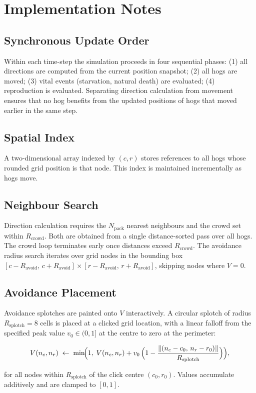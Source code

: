 \documentclass[11pt]{article}
\begin{document}
\section{Implementation Notes}

\subsection{Synchronous Update Order}

Within each time-step the simulation proceeds in four sequential phases:
(1) all directions are computed from the current position snapshot;
(2) all hogs are moved;
(3) vital events (starvation, natural death) are evaluated;
(4) reproduction is evaluated.
Separating direction calculation from movement ensures that no hog benefits
from the updated positions of hogs that moved earlier in the same step.

\subsection{Spatial Index}

A two-dimensional array indexed by $(c, r)$ stores references to all hogs
whose rounded grid position is that node.  This index is maintained
incrementally as hogs move.

\subsection{Neighbour Search}

Direction calculation requires the $N_{\mathrm{pack}}$ nearest neighbours and
the crowd set within $R_{\mathrm{crowd}}$.  Both are obtained from a single
distance-sorted pass over all hogs.  The crowd loop terminates early once
distances exceed $R_{\mathrm{crowd}}$.  The avoidance radius search iterates
over grid nodes in the bounding box $[c - R_{\mathrm{avoid}},\,
c + R_{\mathrm{avoid}}] \times [r - R_{\mathrm{avoid}},\, r +
R_{\mathrm{avoid}}]$, skipping nodes where $V = 0$.

\subsection{Avoidance Placement}

Avoidance splotches are painted onto $V$ interactively.  A circular splotch of
radius $R_{\mathrm{splotch}} = 8$ cells is placed at a clicked grid location,
with a linear falloff from the specified peak value $v_0 \in (0, 1]$ at the
centre to zero at the perimeter:

\[
  V(n_c, n_r) \;\leftarrow\;
  \min\!\Bigl(1,\; V(n_c, n_r)
    + v_0\,\Bigl(1 - \frac{\|(n_c - c_0,\, n_r - r_0)\|}{R_{\mathrm{splotch}}}\Bigr)\Bigr),
\]

for all nodes within $R_{\mathrm{splotch}}$ of the click centre $(c_0, r_0)$.
Values accumulate additively and are clamped to $[0, 1]$.
\end{document}
